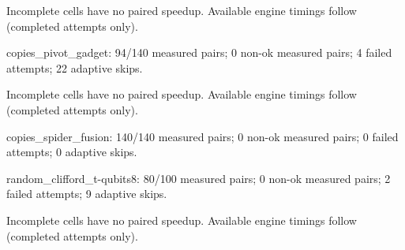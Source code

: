 \documentclass{article}
\begin{document}
\noindent Incomplete cells have no paired speedup. Available engine timings follow (completed attempts only).\par\par\medskip
\quad
\par\medskip
\noindent copies\_pivot\_gadget: 94/140 measured pairs; 0 non-ok measured pairs; 4 failed attempts; 22 adaptive skips.\par
\noindent Incomplete cells have no paired speedup. Available engine timings follow (completed attempts only).\par\par\medskip
\quad
\par\medskip
\noindent copies\_spider\_fusion: 140/140 measured pairs; 0 non-ok measured pairs; 0 failed attempts; 0 adaptive skips.\par
\quad
\par\medskip
\noindent random\_clifford\_t-qubits8: 80/100 measured pairs; 0 non-ok measured pairs; 2 failed attempts; 9 adaptive skips.\par
\noindent Incomplete cells have no paired speedup. Available engine timings follow (completed attempts only).\par\par\medskip
\clearpage
\end{document}
